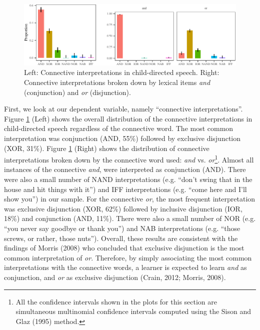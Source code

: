 \documentclass[,man,floatsintext]{apa6}
\let\rmarkdownfootnote\footnote%
\def\footnote{\protect\rmarkdownfootnote}
\begin{document}
\begin{figure}[tb]

{\centering \includegraphics{figs/interpretationPlot-1} 

}

\caption{Left: Connective interpretations in child-directed speech. Right: Connective interpretations broken down by lexical items \textit{and} (conjunction) and \textit{or} (disjunction).}\label{fig:interpretationPlot}
\end{figure}

First, we look at our dependent variable, namely \enquote{connective interpretations}. Figure \ref{fig:interpretationPlot} (Left) shows the overall distribution of the connective interpretations in child-directed speech regardless of the connective word. The most common interpretation was conjunction (AND, 55\%) followed by exclusive disjunction (XOR, 31\%). Figure \ref{fig:interpretationPlot} (Right) shows the distribution of connective interpretations broken down by the connective word used: \emph{and} vs. \emph{or}\footnote{All the confidence intervals shown in the plots for this section are simultaneous multinomial confidence intervals computed using the Sison and Glaz (1995) method.}. Almost all instances of the connective \emph{and}, were interpreted as conjunction (AND). There were also a small number of NAND interpretations (e.g. \enquote{don't swing that in the house and hit things with it}) and IFF interpretations (e.g. \enquote{come here and I'll show you}) in our sample. For the connective \emph{or}, the most frequent interpretation was exclusive disjunction (XOR, 62\%) followed by inclusive disjunction (IOR, 18\%) and conjunction (AND, 11\%). There were also a small number of NOR (e.g. \enquote{you never say goodbye or thank you}) and NAB interpretations (e.g. \enquote{those screws, or rather, those nuts}). Overall, these results are consistent with the findings of Morris (2008) who concluded that exclusive disjunction is the most common interpretation of \emph{or}. Therefore, by simply associating the most common interpretations with the connective words, a learner is expected to learn \emph{and} as conjunction, and \emph{or} as exclusive disjunction (Crain, 2012; Morris, 2008).
\end{document}
